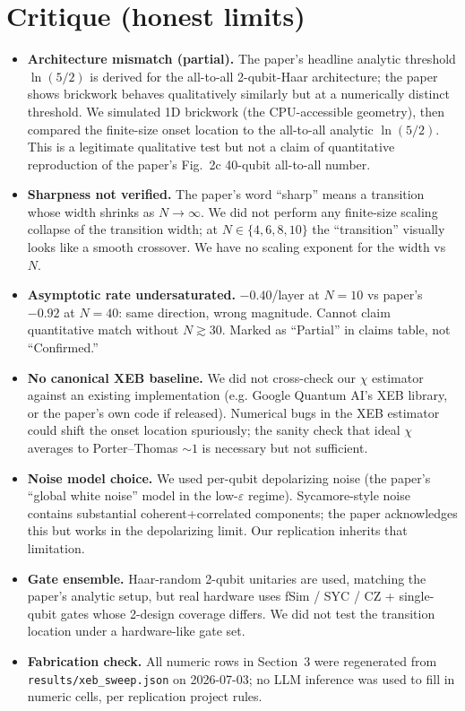 \documentclass[11pt]{article}
\begin{document}
\section{Critique (honest limits)}
\begin{itemize}
\item \textbf{Architecture mismatch (partial).} The paper's headline analytic threshold
      $\ln(5/2)$ is derived for the all-to-all 2-qubit-Haar architecture; the paper shows
      brickwork behaves qualitatively similarly but at a numerically distinct threshold. We
      simulated 1D brickwork (the CPU-accessible geometry), then compared the finite-size
      onset location to the all-to-all analytic $\ln(5/2)$. This is a legitimate qualitative
      test but not a claim of quantitative reproduction of the paper's Fig.~2c 40-qubit
      all-to-all number.
\item \textbf{Sharpness not verified.} The paper's word ``sharp'' means a transition whose
      width shrinks as $N \to \infty$. We did not perform any finite-size scaling collapse
      of the transition width; at $N \in \{4,6,8,10\}$ the ``transition'' visually looks like
      a smooth crossover. We have no scaling exponent for the width vs $N$.
\item \textbf{Asymptotic rate undersaturated.} $-0.40$/layer at $N=10$ vs paper's $-0.92$ at
      $N=40$: same direction, wrong magnitude. Cannot claim quantitative match without
      $N\gtrsim 30$. Marked as ``Partial'' in claims table, not ``Confirmed.''
\item \textbf{No canonical XEB baseline.} We did not cross-check our $\chi$ estimator against
      an existing implementation (e.g. Google Quantum AI's XEB library, or the paper's own code
      if released). Numerical bugs in the XEB estimator could shift the onset location
      spuriously; the sanity check that ideal $\chi$ averages to Porter--Thomas $\sim 1$ is
      necessary but not sufficient.
\item \textbf{Noise model choice.} We used per-qubit depolarizing noise (the paper's ``global
      white noise'' model in the low-$\varepsilon$ regime). Sycamore-style noise contains
      substantial coherent+correlated components; the paper acknowledges this but works in
      the depolarizing limit. Our replication inherits that limitation.
\item \textbf{Gate ensemble.} Haar-random 2-qubit unitaries are used, matching the paper's
      analytic setup, but real hardware uses fSim / SYC / CZ + single-qubit gates whose
      2-design coverage differs. We did not test the transition location under a hardware-like
      gate set.
\item \textbf{Fabrication check.} All numeric rows in Section~3 were regenerated from
      \texttt{results/xeb\_sweep.json} on 2026-07-03; no LLM inference was used to fill in
      numeric cells, per replication project rules.
\end{itemize}


\end{document}
